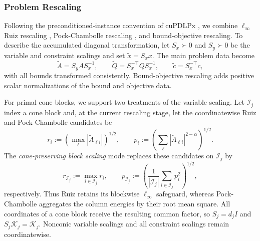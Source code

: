 \documentclass[letterpaper]{article} %
\theoremstyle{definition}
\theoremstyle{remark}
\begin{document}
\subsubsection{Problem Rescaling}
\label{sec:problem-rescaling}

Following the preconditioned-instance convention of
cuPDLPx \cite{lu2025cupdlpx}, we combine $\ell_\infty$ Ruiz
rescaling \cite{ruiz2001scaling}, Pock-Chambolle
rescaling
\cite{pock2011diagonal}, and bound-objective rescaling. To describe
the accumulated diagonal transformation, let $S_x\succ0$ and $S_y\succ0$ be
the variable and constraint scalings and set $\widetilde x=S_xx$. The main
problem data become
\begin{equation}
\label{eq:problem-rescaling}
    \widetilde A=S_yAS_x^{-1},
    \qquad
    \widetilde Q=S_x^{-\top}QS_x^{-1},
    \qquad
    \widetilde c=S_x^{-\top}c,
\end{equation}
with all bounds transformed consistently. Bound-objective rescaling adds
positive scalar normalizations of the bound and objective data.

For primal cone blocks, we support two treatments of the variable scaling.
Let $\mathcal I_j$ index a cone block and, at the current rescaling stage, let
the coordinatewise Ruiz and Pock-Chambolle candidates be
\begin{equation}
\label{eq:cone-scaling-candidates}
    r_i
    :=\left(\max_{\ell}|\widetilde A_{\ell i}|\right)^{1/2},
    \qquad
    p_i
    :=\left(\sum_{\ell}|\widetilde A_{\ell i}|^{2-\alpha}\right)^{1/2}.
\end{equation}
The \emph{cone-preserving block scaling} mode replaces these candidates on
$\mathcal I_j$ by
\begin{equation}
\label{eq:cone-preserving-scaling}
    r_{\mathcal I_j}:=\max_{i\in\mathcal I_j}r_i,
    \qquad
    p_{\mathcal I_j}
    :=\left(\frac{1}{|\mathcal I_j|}
        \sum_{i\in\mathcal I_j}p_i^2\right)^{1/2},
\end{equation}
respectively. Thus Ruiz retains its blockwise $\ell_\infty$ safeguard, whereas
Pock-Chambolle aggregates the column energies by their root mean square. All
coordinates of a cone block receive the resulting common factor, so
$S_j=d_jI$ and $S_j\mathcal K_j=\mathcal K_j$. Nonconic variable scalings and
all constraint scalings remain coordinatewise.
\end{document}
